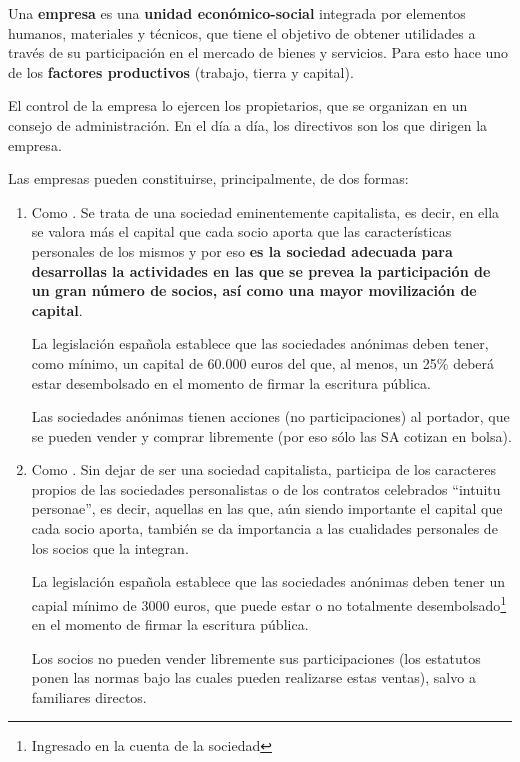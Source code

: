 \documentclass[nochap,palatino,shortheader]{apuntes}
\begin{document}
\begin{defn}[Empresa]
Una \textbf{empresa} es una \textbf{unidad económico-social} integrada por elementos humanos, materiales y técnicos, que tiene el objetivo de obtener utilidades a través de su participación en el mercado de bienes y servicios. Para esto hace uno de los \textbf{factores productivos} (trabajo, tierra y capital).

El control de la empresa lo ejercen los propietarios, que se organizan en un consejo de administración. En el día a día, los directivos son los que dirigen la empresa.

\end{defn}
\newpage
Las empresas pueden constituirse, principalmente, de dos formas:
\begin{enumerate}
\item Como . Se trata de una sociedad eminentemente capitalista, es decir, en ella se valora más el capital que cada socio aporta que las características personales de los mismos y por eso \textbf{es la sociedad adecuada para desarrollas la actividades en las que se prevea la participación de un gran número de socios, así como una mayor movilización de capital}.

La legislación española establece que las sociedades anónimas deben tener, como mínimo, un capital de 60.000 euros del que, al menos, un 25\% deberá estar desembolsado en el momento de firmar la escritura pública.

Las sociedades anónimas tienen acciones (no participaciones) al portador, que se pueden vender y comprar libremente (por eso sólo las SA cotizan en bolsa).


\item Como  . Sin dejar de ser una sociedad capitalista, participa de los caracteres propios de las sociedades personalistas o de los contratos celebrados ``intuitu personae'', es decir, aquellas en las que, aún siendo importante el capital que cada socio aporta, también se da importancia a las cualidades personales de los socios que la integran.

La legislación española establece que las sociedades anónimas deben tener un capial mínimo de 3000 euros, que puede estar o no totalmente desembolsado\footnote{Ingresado en la cuenta de la sociedad} en el momento de firmar la escritura pública.

Los socios no pueden vender libremente sus participaciones (los estatutos ponen las normas bajo las cuales pueden realizarse estas ventas), salvo a familiares directos.
\end{enumerate}
\end{document}
